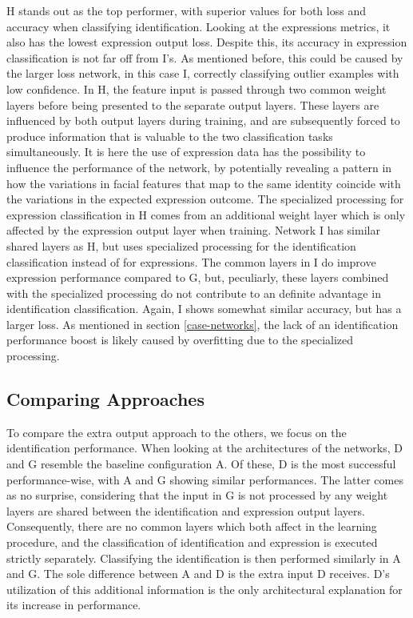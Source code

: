 \noindent H stands out as the top performer, with superior values for both loss and accuracy when classifying identification. Looking at the expressions metrics, it also has the lowest expression output loss. Despite this, its accuracy in expression classification is not far off from I's. As mentioned before, this could be caused by the larger loss network, in this case I, correctly classifying outlier examples with low confidence. In H, the feature input is passed through two common weight layers before being presented to the separate output layers. These layers are influenced by both output layers during training, and are subsequently forced to produce information that is valuable to the two classification tasks simultaneously. It is here the use of expression data has the possibility to influence the performance of the network, by potentially revealing a pattern in how the variations in facial features that map to the same identity coincide with the variations in the expected expression outcome. The specialized processing for expression classification in H comes from an additional weight layer which is only affected by the expression output layer when training. Network I has similar shared layers as H, but uses specialized processing for the identification classification instead of for expressions. The common layers in I do improve expression performance compared to G, but, peculiarly, these layers combined with the specialized processing do not contribute to an definite advantage in identification classification. Again, I shows somewhat similar accuracy, but has a larger loss. As mentioned in section \ref{case-networks}, the lack of an identification performance boost is likely caused by overfitting due to the specialized processing. 

\subsection{Comparing Approaches}

To compare the extra output approach to the others, we focus on the identification performance. When looking at the architectures of the networks, D and G resemble the baseline configuration A. Of these, D is the most successful performance-wise, with A and G showing similar performances. The latter comes as no surprise, considering that the input in G is not processed by any weight layers are shared between the identification and expression output layers. Consequently, there are no common layers which both affect in the learning procedure, and the classification of identification and expression is executed strictly separately. Classifying the identification is then performed similarly in A and G. The sole difference between A and D is the extra input D receives. D's utilization of this additional information is the only architectural explanation for its increase in performance. \\

